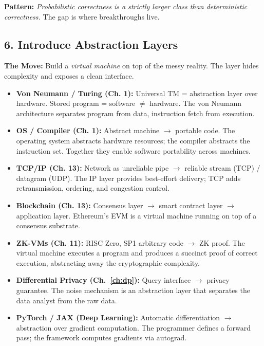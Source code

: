 \textbf{Pattern:} \emph{Probabilistic correctness is a strictly larger class than deterministic correctness.} The gap is where breakthroughs live.
\subsection{6. Introduce Abstraction Layers}
\label{sec:anatomy:abstraction}

\textbf{The Move:} Build a \emph{virtual machine} on top of the messy reality. The layer hides complexity and exposes a clean interface.

\begin{itemize}
\item \textbf{Von Neumann / Turing (Ch. 1):} Universal TM = abstraction layer over hardware. Stored program = software $\neq$ hardware. The von Neumann architecture separates program from data, instruction fetch from execution.

\item \textbf{OS / Compiler (Ch. 1):} Abstract machine $\to$ portable code. The operating system abstracts hardware resources; the compiler abstracts the instruction set. Together they enable software portability across machines.

\item \textbf{TCP/IP (Ch. 13):} Network as unreliable pipe $\to$ reliable stream (TCP) / datagram (UDP). The IP layer provides best-effort delivery; TCP adds retransmission, ordering, and congestion control.

\item \textbf{Blockchain (Ch. 13):} Consensus layer $\to$ smart contract layer $\to$ application layer. Ethereum's EVM is a virtual machine running on top of a consensus substrate.

\item \textbf{ZK-VMs (Ch. 11):} RISC Zero, SP1 arbitrary code $\to$ ZK proof. The virtual machine executes a program and produces a succinct proof of correct execution, abstracting away the cryptographic complexity.

\item \textbf{Differential Privacy (Ch.~\ref{ch:dp}):} Query interface $\to$ privacy guarantee. The noise mechanism is an abstraction layer that separates the data analyst from the raw data.

\item \textbf{PyTorch / JAX (Deep Learning):} Automatic differentiation $\to$ abstraction over gradient computation. The programmer defines a forward pass; the framework computes gradients via autograd.


\end{itemize}
